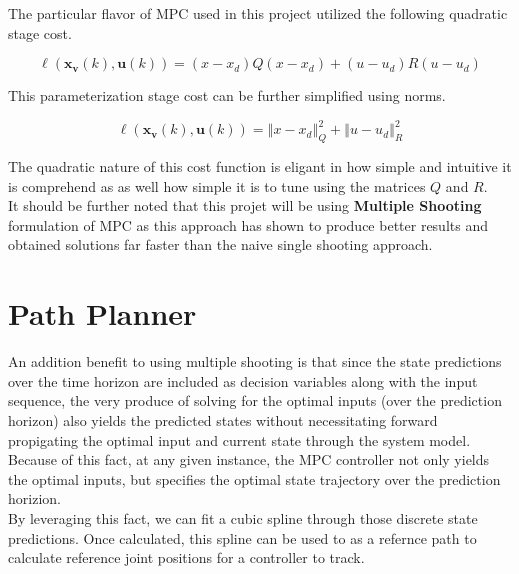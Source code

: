 \documentclass[journal]{IEEEtran}
\begin{document}
The particular flavor of MPC used in this project utilized the following quadratic stage cost.

\begin{equation}
  \ell\left(\mathbf{x}_{\mathbf{v}}(k), \mathbf{u}(k)\right) = (x-x_d)Q(x-x_d) + (u-u_d)R(u-u_d)
\end{equation}

This parameterization stage cost can be further simplified using norms.


\begin{equation}
  \ell\left(\mathbf{x}_{\mathbf{v}}(k), \mathbf{u}(k)\right) = \left\Vert x - x_d \right\Vert^{2}_{Q} + \left\Vert u -u_d \right\Vert^{2}_{R}
\end{equation}

The quadratic nature of this cost function is eligant in how simple and intuitive it is comprehend as as well how simple it is to tune using the matrices $Q$ and $R$. \\

It should be further noted that this projet will be using \textbf{Multiple Shooting} formulation of MPC as this approach has shown to produce better results and obtained solutions far faster than the naive single shooting approach.




\section{Path Planner}

An addition benefit to using multiple shooting is that since the state predictions over the time horizon are included as decision variables along with the input sequence, the very produce of solving for the optimal inputs (over the prediction horizon) also yields the predicted states without necessitating forward propigating the optimal input and current state through the system model.\\

Because of this fact, at any given instance, the MPC controller not only yields the optimal inputs, but specifies the optimal state trajectory over the prediction horizion. \\

By leveraging this fact, we can fit a cubic spline through those discrete state predictions. Once calculated, this spline can be used to as a refernce path to calculate reference joint positions for a controller to track. \\
\end{document}
